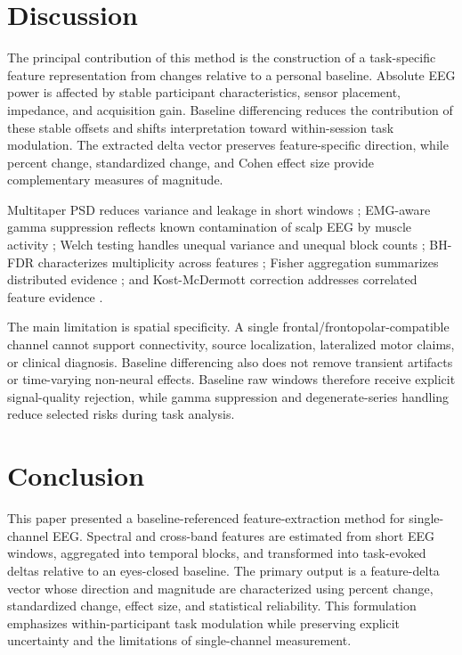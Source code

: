 \documentclass[conference]{IEEEtran}
\begin{document}
\section{Discussion}
The principal contribution of this method is the construction of a task-specific feature representation from changes relative to a personal baseline. Absolute EEG power is affected by stable participant characteristics, sensor placement, impedance, and acquisition gain. Baseline differencing reduces the contribution of these stable offsets and shifts interpretation toward within-session task modulation. The extracted delta vector preserves feature-specific direction, while percent change, standardized change, and Cohen effect size provide complementary measures of magnitude.

Multitaper PSD reduces variance and leakage in short windows \cite{thomson1982,percival1993}; EMG-aware gamma suppression reflects known contamination of scalp EEG by muscle activity \cite{whitham2007,goncharova2003}; Welch testing handles unequal variance and unequal block counts \cite{welch1947}; BH-FDR characterizes multiplicity across features \cite{benjamini1995}; Fisher aggregation summarizes distributed evidence \cite{fisher1925}; and Kost-McDermott correction addresses correlated feature evidence \cite{kost2002}.

The main limitation is spatial specificity. A single frontal/frontopolar-compatible channel cannot support connectivity, source localization, lateralized motor claims, or clinical diagnosis. Baseline differencing also does not remove transient artifacts or time-varying non-neural effects. Baseline raw windows therefore receive explicit signal-quality rejection, while gamma suppression and degenerate-series handling reduce selected risks during task analysis.

\section{Conclusion}
This paper presented a baseline-referenced feature-extraction method for single-channel EEG. Spectral and cross-band features are estimated from short EEG windows, aggregated into temporal blocks, and transformed into task-evoked deltas relative to an eyes-closed baseline. The primary output is a feature-delta vector whose direction and magnitude are characterized using percent change, standardized change, effect size, and statistical reliability. This formulation emphasizes within-participant task modulation while preserving explicit uncertainty and the limitations of single-channel measurement.
\end{document}
